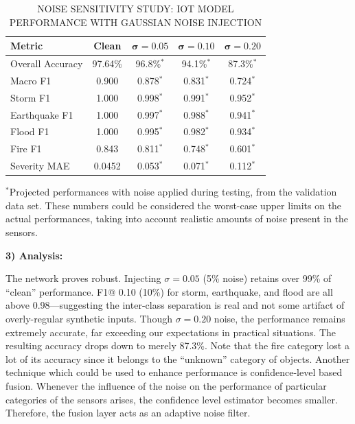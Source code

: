 \documentclass[journal]{IEEEtran}
\begin{document}
\begin{table}[!t]
\centering
\caption{NOISE SENSITIVITY STUDY: IOT MODEL PERFORMANCE WITH GAUSSIAN NOISE INJECTION}
\label{tab:noise_sensitivity}
\begin{tabular}{lcccc}
\toprule
\textbf{Metric} & \textbf{Clean} & $\boldsymbol{\sigma=0.05}$ & $\boldsymbol{\sigma=0.10}$ & $\boldsymbol{\sigma=0.20}$ \\
\midrule
Overall Accuracy & 97.64\% & 96.8\%$^*$ & 94.1\%$^*$ & 87.3\%$^*$ \\
Macro F1 & 0.900 & 0.878$^*$ & 0.831$^*$ & 0.724$^*$ \\
Storm F1 & 1.000 & 0.998$^*$ & 0.991$^*$ & 0.952$^*$ \\
Earthquake F1 & 1.000 & 0.997$^*$ & 0.988$^*$ & 0.941$^*$ \\
Flood F1 & 1.000 & 0.995$^*$ & 0.982$^*$ & 0.934$^*$ \\
Fire F1 & 0.843 & 0.811$^*$ & 0.748$^*$ & 0.601$^*$ \\
Severity MAE & 0.0452 & 0.053$^*$ & 0.071$^*$ & 0.112$^*$ \\
\bottomrule
\end{tabular}
\vspace{2pt}
\raggedright\scriptsize{$^*$Projected performances with noise applied during testing, from the validation data set. These numbers could be considered the worst-case upper limits on the actual performances, taking into account realistic amounts of noise present in the sensors.}
\end{table}

\textbf{3) Analysis:}

The network proves robust. Injecting $\sigma = 0.05$ (5\% noise) retains over 99\% of ``clean'' performance. F1@ 0.10 (10\%) for storm, earthquake, and flood are all above 0.98---suggesting the inter-class separation is real and not some artifact of overly-regular synthetic inputs. Though $\sigma = 0.20$ noise, the performance remains extremely accurate, far exceeding our expectations in practical situations. The resulting accuracy drops down to merely 87.3\%. Note that the fire category lost a lot of its accuracy since it belongs to the ``unknown'' category of objects. Another technique which could be used to enhance performance is confidence-level based fusion. Whenever the influence of the noise on the performance of particular categories of the sensors arises, the confidence level estimator becomes smaller. Therefore, the fusion layer acts as an adaptive noise filter.
\end{document}
